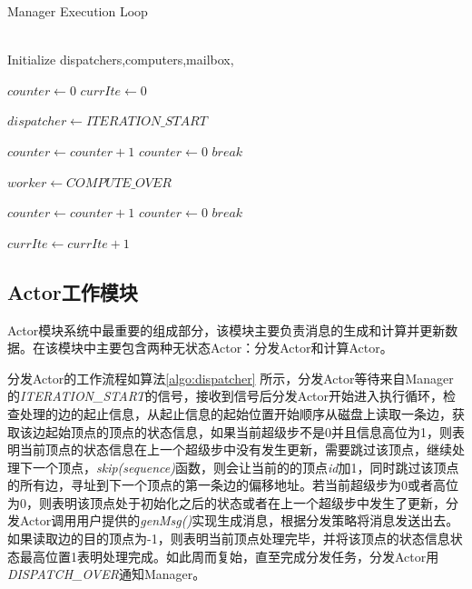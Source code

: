 \begin{algorithm}[htb!]
{
{

\renewcommand\baselinestretch{1.5}\selectfont %

\caption{Manager Execution Loop}
\label{algo:manager}
\begin{algorithmic}[1]
\REQUIRE ~\\
Initialize dispatchers,computers,mailbox, 

\STATE $counter \leftarrow 0$
\STATE $currIte \leftarrow 0$

\STATE $dispatcher \leftarrow ITERATION\_START$
\ENDFOR

\STATE $counter \leftarrow counter + 1$
\STATE $counter \leftarrow 0$
\STATE $break$
\ENDIF
\ENDWHILE

\STATE $worker \leftarrow COMPUTE\_OVER$
\ENDFOR

\STATE $counter \leftarrow counter + 1$
\STATE $counter \leftarrow 0$
\STATE $break$
\ENDIF
\ENDWHILE

\STATE $currIte \leftarrow currIte + 1$
\ENDWHILE
\end{algorithmic}
}
\par}
\end{algorithm}

\subsection{Actor工作模块}
Actor模块系统中最重要的组成部分，该模块主要负责消息的生成和计算并更新数据。在该模块中主要包含两种无状态Actor：分发Actor和计算Actor。

分发Actor的工作流程如算法\ref{algo:dispatcher} 所示，分发Actor等待来自Manager的\textit{ITERATION\_START}的信号，接收到信号后分发Actor开始进入执行循环，检查处理的边的起止信息，从起止信息的起始位置开始顺序从磁盘上读取一条边，获取该边起始顶点的顶点的状态信息，如果当前超级步不是0并且信息高位为1，则表明当前顶点的状态信息在上一个超级步中没有发生更新，需要跳过该顶点，继续处理下一个顶点，\textit{skip(sequence)}函数，则会让当前的的顶点\textit{id}加1，同时跳过该顶点的所有边，寻址到下一个顶点的第一条边的偏移地址。若当前超级步为0或者高位为0，则表明该顶点处于初始化之后的状态或者在上一个超级步中发生了更新，分发Actor调用用户提供的\textit{genMsg()}实现生成消息，根据分发策略将消息发送出去。如果读取边的目的顶点为-1，则表明当前顶点处理完毕，并将该顶点的状态信息状态最高位置1表明处理完成。如此周而复始，直至完成分发任务，分发Actor用\textit{DISPATCH\_OVER}通知Manager。

